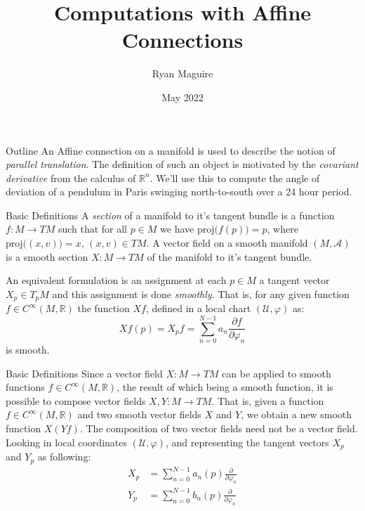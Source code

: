 \documentclass{beamer}
\title{Computations with Affine Connections}
\author{Ryan Maguire}
\date{May 2022}
\begin{document}
    \maketitle
    \begin{frame}{Outline}
        An Affine connection on a manifold is used to describe the notion of
        \textit{parallel translation}. The definition of such an object is
        motivated by the \textit{covariant derivative} from the calculus of
        $\mathbb{R}^{n}$. We'll use this to compute the angle of deviation of
        a pendulum in Paris swinging north-to-south over a 24 hour period.
    \end{frame}
    \begin{frame}{Basic Definitions}
        A \textit{section} of a manifold to it's tangent bundle is a function
        $f:M\rightarrow{TM}$ such that for all $p\in{M}$ we have
        $\textrm{proj}\big(f(p)\big)=p$, where
        $\textrm{proj}\big((x,v)\big)=x$, $(x,v)\in{TM}$.
        A vector field on a smooth manifold $(M,\mathcal{A})$ is a smooth
        section $X:M\rightarrow{TM}$ of the manifold to it's tangent bundle.
        \par\hfill\par
        An equivalent formulation is an assignment at each $p\in{M}$ a
        tangent vector $X_{p}\in{T}_{p}M$ and this assignment is done
        \textit{smoothly}. That is, for any given function
        $f\in{C}^{\infty}(M,\mathbb{R})$ the function $Xf$, defined in a
        local chart $(\mathcal{U},\varphi)$ as:
        \begin{equation}
            Xf(p)=X_{p}f
                =\sum_{n=0}^{N-1}a_{n}\frac{\partial{f}}{\partial\varphi_{n}}
        \end{equation}
        is smooth.
    \end{frame}
    \begin{frame}{Basic Definitions}
        Since a vector field $X:M\rightarrow{TM}$ can be applied to smooth
        functions $f\in{C}^{\infty}(M,\mathbb{R})$, the result of which being
        a smooth function, it is possible to compose vector fields
        $X,Y:M\rightarrow{TM}$. That is, given a function
        $f\in{C}^{\infty}(M,\mathbb{R})$ and two smooth vector fields $X$ and
        $Y$, we obtain a new smooth function $X(Yf)$. The composition of two
        vector fields need not be a vector field. Looking in local
        coordinates $(\mathcal{U},\varphi)$, and representing the tangent
        vectors $X_{p}$ and $Y_{p}$ as following:
        \begin{align}
            X_{p}&=\sum_{n=0}^{N-1}a_{n}(p)\frac{\partial}{\partial\varphi_{n}}\\
            Y_{p}&=\sum_{n=0}^{N-1}b_{n}(p)\frac{\partial}{\partial\varphi_{n}}
        \end{align}
    \end{frame}
\end{document}
